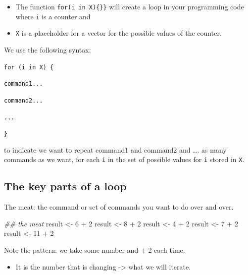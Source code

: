 \documentclass[
  letterpaper,
  DIV=11,
  numbers=noendperiod]{scrreprt}
\newenvironment{Shaded}{\begin{snugshade}}{\end{snugshade}}
\newcommand{\DecValTok}[1]{\textcolor[rgb]{0.68,0.00,0.00}{#1}}
\newcommand{\DocumentationTok}[1]{\textcolor[rgb]{0.37,0.37,0.37}{\textit{#1}}}
\newcommand{\NormalTok}[1]{\textcolor[rgb]{0.00,0.23,0.31}{#1}}
\newcommand{\OtherTok}[1]{\textcolor[rgb]{0.00,0.23,0.31}{#1}}
\newcommand{\SpecialCharTok}[1]{\textcolor[rgb]{0.37,0.37,0.37}{#1}}
\providecommand{\tightlist}{%
  \setlength{\itemsep}{0pt}\setlength{\parskip}{0pt}}\usepackage{longtable,booktabs,array}
\begin{document}
\begin{itemize}
\tightlist
\item
  The function \texttt{for(i\ in\ X)\{\}\}} will create a loop in your
  programming code where \texttt{i} is a counter and
\item
  \texttt{X} is a placeholder for a vector for the possible values of
  the counter.
\end{itemize}

We use the following syntax:

\texttt{for\ (i\ in\ X)\ \{}

\texttt{command1...}

\texttt{command2...}

\texttt{...}

\texttt{\}}

to indicate we want to repeat command1 and command2 and \ldots. as many
commands as we want, for each \texttt{i} in the set of possible values
for \texttt{i} stored in \texttt{X}.

\hypertarget{the-key-parts-of-a-loop}{%
\subsection{The key parts of a loop}\label{the-key-parts-of-a-loop}}

The meat: the command or set of commands you want to do over and over.

\begin{Shaded}
\begin{Highlighting}[]
\DocumentationTok{\#\# the meat}
\NormalTok{result }\OtherTok{\textless{}{-}} \DecValTok{6} \SpecialCharTok{+} \DecValTok{2}
\NormalTok{result }\OtherTok{\textless{}{-}} \DecValTok{8} \SpecialCharTok{+} \DecValTok{2}
\NormalTok{result }\OtherTok{\textless{}{-}} \DecValTok{4} \SpecialCharTok{+} \DecValTok{2}
\NormalTok{result }\OtherTok{\textless{}{-}} \DecValTok{7} \SpecialCharTok{+} \DecValTok{2}
\NormalTok{result }\OtherTok{\textless{}{-}} \DecValTok{11} \SpecialCharTok{+} \DecValTok{2}
\end{Highlighting}
\end{Shaded}

Note the pattern: we take some number and + 2 each time.

\begin{itemize}
\tightlist
\item
  It is the number that is changing -\textgreater{} what we will
  iterate.
\end{itemize}
\end{document}
